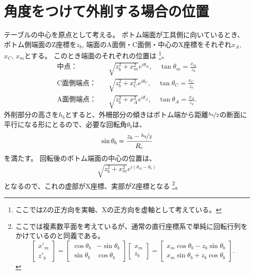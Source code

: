 \section{角度をつけて外削する場合の位置}
テーブルの中心を原点として考える。
ボトム端面が工具側に向いているとき、ボトム側端面のZ座標を$z_b$, 端面のA面側・C面側・中心のX座標をそれぞれ$x_A$, $x_C$, $x_m$とする。
このとき端面のそれぞれの位置は
\footnote{ここではZの正方向を実軸、Xの正方向を虚軸として考えている。}、
\begin{subequations}
\begin{align}
  \text{中点：}&\quad \sqrt{z_b^2+x_m^2}e^{i\theta_m}, \quad \tan\theta_m = \frac{x_m}{z_b}\\
  \text{C面側端点：}&\quad \sqrt{z_b^2+x_C^2}e^{i\theta_C}, \quad \tan\theta_C = \frac{x_C}{z_b}\\
  \text{A面側端点：}&\quad \sqrt{z_b^2+x_A^2}e^{i\theta_A}, \quad \tan\theta_A = \frac{x_A}{z_b}.
\end{align}
\end{subequations}
外削部分の高さを$h_b$とすると、外柵部分の傾きはボトム端から距離$\nicefrac{h_b}2$の断面に平行になる形にとるので、必要な回転角$\theta_b$は、
\begin{equation}
  \sin\theta_b = \frac{z_b-\nicefrac{h_b}2}{R_\text c}
\end{equation}
を満たす。
回転後のボトム端面の中心の位置は、
\begin{align}
  \sqrt{z_b^2+x_m^2}e^{i(\theta_m-\theta_b)}
\end{align}
となるので、これの虚部がX座標、実部がZ座標となる
\footnote{ここでは複素数平面を考えているが、通常の直行座標系で単純に回転行列をかけているのと同義である。
\begin{equation*}
  \left[
    \begin{array}{c}
      x'_m\\
      z'_b
    \end{array}
  \right]
  = \left[
    \begin{array}{cc}
      \cos\theta_b & -\sin\theta_b\\
      \sin\theta_b & \cos\theta_b
    \end{array}
  \right]\!\!
  \left[
    \begin{array}{c}
      x_m\\
      z_b
    \end{array}
  \right]
  = \left[
    \begin{array}{c}
      x_m\cos\theta_b-z_b\sin\theta_b\\
      x_m\sin\theta_b+z_b\cos\theta_b
    \end{array}
  \right].
\end{equation*}}。

